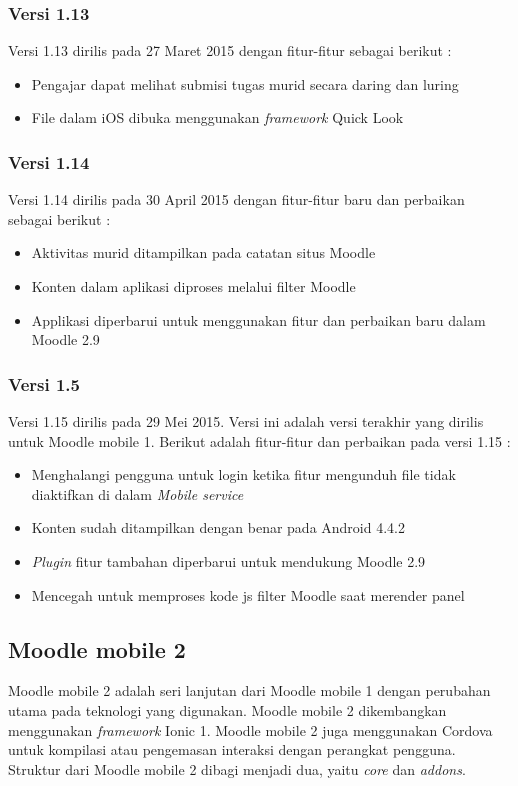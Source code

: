 \subsubsection{Versi 1.13}
Versi 1.13 dirilis pada 27 Maret 2015 dengan fitur-fitur sebagai berikut : \cite{moodle:dev}
	\begin{itemize}
		\item Pengajar dapat melihat submisi tugas murid secara daring dan luring
		\item File dalam iOS dibuka menggunakan \textit{framework} Quick Look
	\end{itemize}

\subsubsection{Versi 1.14}
Versi 1.14 dirilis pada 30 April 2015 dengan fitur-fitur baru dan perbaikan sebagai berikut : \cite{moodle:dev}
	\begin{itemize}
		\item Aktivitas murid ditampilkan pada catatan situs Moodle
		\item Konten dalam aplikasi diproses melalui filter Moodle
		\item Applikasi diperbarui untuk menggunakan fitur dan perbaikan baru dalam Moodle 2.9 
	\end{itemize}

\subsubsection{Versi 1.5}
Versi 1.15 dirilis pada 29 Mei 2015. Versi ini adalah versi terakhir yang dirilis untuk Moodle mobile 1. Berikut adalah fitur-fitur dan perbaikan pada versi 1.15 : \cite{moodle:dev}
	\begin{itemize}
		\item Menghalangi pengguna untuk login ketika fitur mengunduh file tidak diaktifkan di dalam \textit{Mobile service}
		\item Konten sudah ditampilkan dengan benar pada Android 4.4.2
		\item \textit{Plugin} fitur tambahan diperbarui untuk mendukung Moodle 2.9
		\item Mencegah untuk memproses kode js filter Moodle saat merender panel
	\end{itemize}

\subsection{Moodle mobile 2}
Moodle mobile 2 adalah seri lanjutan dari Moodle mobile 1 dengan perubahan utama pada teknologi yang digunakan. Moodle mobile 2 dikembangkan menggunakan \textit{framework} Ionic 1. Moodle mobile 2 juga menggunakan Cordova untuk kompilasi atau pengemasan interaksi dengan perangkat pengguna. Struktur dari Moodle mobile 2 dibagi menjadi dua, yaitu \textit{core} dan \textit{addons}. 

